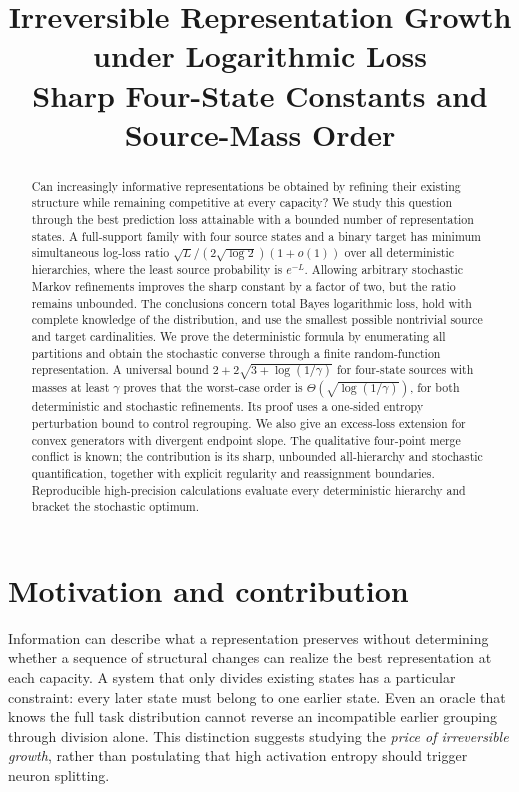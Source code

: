 \documentclass[11pt]{article}
\title{Irreversible Representation Growth under Logarithmic Loss\\[4pt]
\large Sharp Four-State Constants and Source-Mass Order}
\theoremstyle{remark}\newtheorem{remark}[theorem]{Remark}
\begin{document}
\maketitle
\begin{abstract}
Can increasingly informative representations be obtained by refining their
existing structure while remaining competitive at every capacity? We study
this question through the best prediction loss attainable with a bounded
number of representation states. A full-support family with four source
states and a binary target has minimum simultaneous log-loss ratio
$\sqrt{L}/(2\sqrt{\log 2})(1+o(1))$ over all deterministic hierarchies,
where the least source probability is $e^{-L}$. Allowing arbitrary stochastic
Markov refinements improves the sharp constant by a factor of two, but the
ratio remains unbounded. The conclusions concern total Bayes logarithmic
loss, hold with complete knowledge of the distribution, and use the smallest
possible nontrivial source and target cardinalities. We prove the deterministic
formula by enumerating all partitions and obtain the stochastic converse
through a finite random-function representation. A universal bound
$2+2\sqrt{3+\log(1/\gamma)}$ for four-state sources with masses at least
$\gamma$ proves that the worst-case order is
$\Theta(\sqrt{\log(1/\gamma)})$, for both deterministic and stochastic
refinements. Its proof uses a one-sided entropy perturbation bound to
control regrouping. We also give an excess-loss extension for convex
generators with divergent endpoint slope. The qualitative four-point
merge conflict is known; the contribution is its sharp, unbounded
all-hierarchy and stochastic quantification, together with explicit
regularity and reassignment boundaries. Reproducible high-precision
calculations evaluate every deterministic hierarchy and bracket the
stochastic optimum.
\end{abstract}
\tableofcontents

\section{Motivation and contribution}
Information can describe what a representation preserves without determining
whether a sequence of structural changes can realize the best representation
at each capacity. A system that only divides existing states has a particular
constraint: every later state must belong to one earlier state. Even an
oracle that knows the full task distribution cannot reverse an incompatible
earlier grouping through division alone. This distinction suggests studying
the \emph{price of irreversible growth}, rather than postulating that high
activation entropy should trigger neuron splitting.
\end{document}
